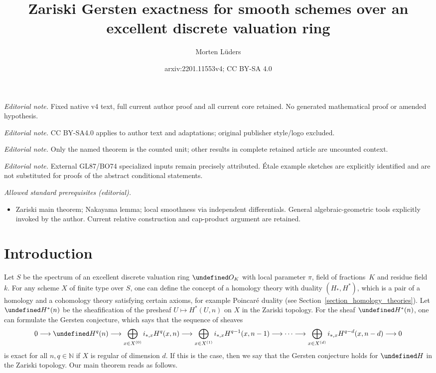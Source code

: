\documentclass[10pt,a4paper]{article}
\title{Zariski Gersten exactness for smooth schemes over an excellent discrete valuation ring}
\author{Morten Lüders}
\date{arxiv:2201.11553v4; CC BY-SA 4.0}
\let\cal\undefined
\numberwithin{equation}{section}
\newtheorem{Key lemma}[theorem]{Key lemma}
\theoremstyle{definition}
\theoremstyle{remark}
\newcommand{\bb}{\mathbb}
\newcommand{\To}{\longrightarrow}
\newcommand{\cal}{\mathcal}
\begin{document}
\maketitle
\noindent\textit{Editorial note.} Fixed native v4 text, full current author proof and all current core retained. No generated mathematical proof or amended hypothesis.\par\medskip
\noindent\textit{Editorial note.} CC BY-SA4.0 applies to author text and adaptations; original publisher style/logo excluded.\par\medskip
\noindent\textit{Editorial note.} Only the named theorem is the counted unit; other results in complete retained article are uncounted context.\par\medskip
\noindent\textit{Editorial note.} External GL87/BO74 specialized inputs remain precisely attributed. Étale example sketches are explicitly identified and are not substituted for proofs of the abstract conditional statements.\par\medskip
\noindent\textit{Allowed standard prerequisites (editorial).}\begin{itemize}
\item Zariski main theorem; Nakayama lemma; local smoothness via independent differentials. General algebraic-geometric tools explicitly invoked by the author. Current relative construction and cap-product argument are retained.
\end{itemize}\medskip
\section{Introduction}
Let $S$ be the spectrum of an excellent discrete valuation ring $\cal O_K$ with local parameter $\pi$, field of fractions~$K$ and residue field $k$. 
For any scheme $X$ of finite type over $S$, one can define the concept of a homology theory with duality $(H_*,H^*)$, which is a pair of a homology and a cohomology theory satisfying certain axioms, for example Poincar\'e duality (see Section~\ref{section_homology_theories}). Let $\cal H^*(n)$ be the sheafification of the presheaf $U\mapsto H^*(U,n)$ on $X$ in the Zariski topology. For the sheaf $\cal H^*(n)$, one can formulate the Gersten conjecture, which says that the sequence of sheaves
\[0\To \cal H^q(n) \To \bigoplus_{x\in X^{(0)}}i_{*,x}H^{q}(x,n)\To \bigoplus_{x\in X^{(1)}}i_{*,x}H^{q-1}(x,n-1)\To\cdots\To \bigoplus_{x\in X^{(d)}}i_{*,x}H^{q-d}(x,n-d)\To 0 \]
is exact for all $n,q \in \bb N$ if $X$ is regular of dimension $d$. If this is the case, then we say that the Gersten conjecture holds for $\cal H$ in the Zariski topology.
Our main theorem reads as follows. 
\end{document}

